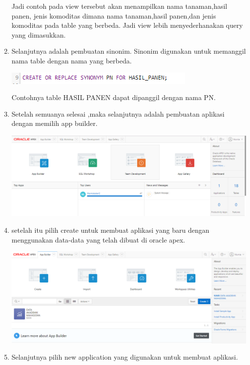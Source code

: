 \documentclass{article}
\begin{document}
\begin{enumerate}
\begin{center}
        \end{center}
        \par Jadi contoh pada view tersebut akan menampilkan nama tanaman,hasil panen, jenis komoditas dimana nama tanaman,hasil panen,dan jenis komoditas pada table yang berbeda. Jadi view lebih menyederhanakan query yang dimasukkan.
        \item Selanjutnya adalah pembuatan sinonim. Sinonim  digunakan untuk memanggil nama table dengan nama yang berbeda.
        \begin{center}
              \includegraphics[width=.8\textwidth]{figure/22.PNG}
        \end{center}
        \par Contohnya table HASIL PANEN dapat dipanggil dengan nama PN.
        \item Setelah  semuanya selesai ,maka selanjutnya adalah pembuatan aplikasi dengan memilih  app builder.
        \begin{center}
              \includegraphics[width=.8\textwidth]{figure/23.PNG}
        \end{center}
        \item setelah itu pilih create untuk membuat aplikasi yang baru dengan menggunakan data-data yang telah dibuat di oracle apex.
        \begin{center}
              \includegraphics[width=.8\textwidth]{figure/24.PNG}
        \end{center}
        \item Selanjutnya pilih new application yang digunakan untuk membuat aplikasi.

\end{enumerate}
\end{document}
